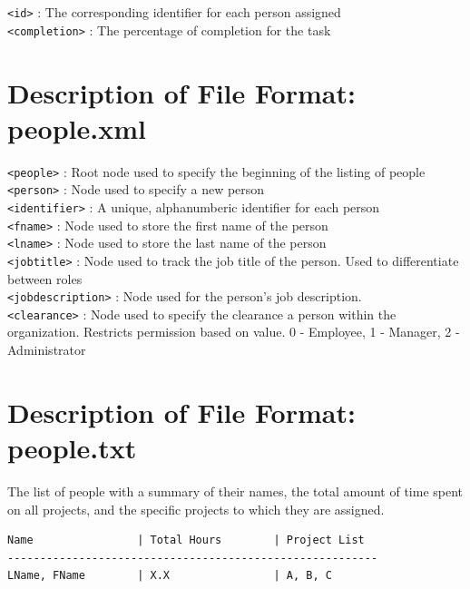 \documentclass[12pt]{article}
\begin{document}
\texttt{<id>} : The corresponding identifier for each person assigned \\

\texttt{<completion>} : The percentage of completion for the task \\

\pagebreak

\section{Description of File Format: people.xml}

\texttt{<people>} : Root node used to specify the beginning of the listing of people \\

\texttt{<person>} : Node used to specify a new person \\

\texttt{<identifier>} : A unique, alphanumberic identifier for each person \\

\texttt{<fname>} : Node used to store the first name of the person \\

\texttt{<lname>} : Node used to store the last name of the person \\

\texttt{<jobtitle>} : Node used to track the job title of the person.
Used to differentiate between roles \\

\texttt{<jobdescription>} : Node used for the person's job description. \\

\texttt{<clearance>} : Node used to specify the clearance a person within the organization.
Restricts permission based on value. 0 - Employee, 1 - Manager, 2 - Administrator \\

\section{Description of File Format: people.txt}

The list of people with a summary of their names, the total amount of time
spent on all projects, and the specific projects to which they are assigned.

\begin{lstlisting}
Name                | Total Hours        | Project List              
---------------------------------------------------------
LName, FName        | X.X                | A, B, C
\end{lstlisting}
\end{document}
